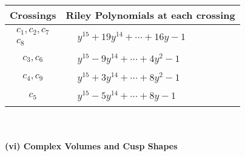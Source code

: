 \documentclass[1p]{elsarticle_modified}
\theoremstyle{definition}
\begin{document}
\begin{tabular}{m{50pt}|m{274pt}}
Crossings & \hspace{64pt}Riley Polynomials at each crossing \\
\hline $$\begin{aligned}c_{1},c_{2},c_{7}\\c_{8}\end{aligned}$$&$\begin{aligned}
&y^{15}+19 y^{14}+\cdots+16 y-1
\end{aligned}$\\
\hline $$\begin{aligned}c_{3},c_{6}\end{aligned}$$&$\begin{aligned}
&y^{15}-9 y^{14}+\cdots+4 y^2-1
\end{aligned}$\\
\hline $$\begin{aligned}c_{4},c_{9}\end{aligned}$$&$\begin{aligned}
&y^{15}+3 y^{14}+\cdots+8 y^2-1
\end{aligned}$\\
\hline $$\begin{aligned}c_{5}\end{aligned}$$&$\begin{aligned}
&y^{15}-5 y^{14}+\cdots+8 y-1
\end{aligned}$\\
\hline
\end{tabular}\\~\\
\newpage\flushleft \textbf{(vi) Complex Volumes and Cusp Shapes}
\end{document}
